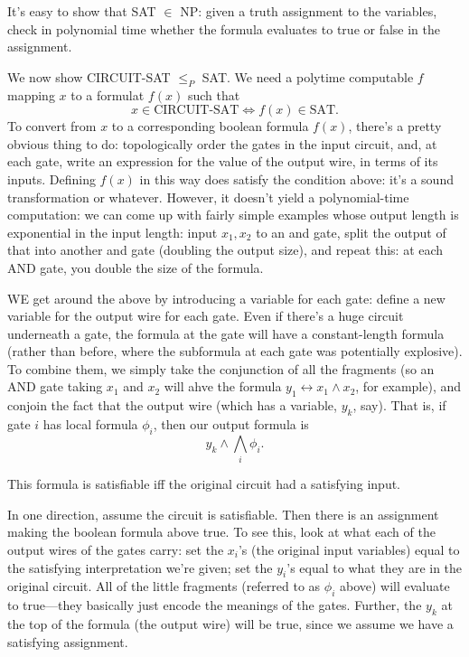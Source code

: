 \documentclass{article}
\begin{document}
It's easy to show that SAT $\in$ NP: given a truth assignment to the variables,
check in polynomial time whether the formula evaluates to true or false
in the assignment.

We now show CIRCUIT-SAT $\leq_P$ SAT. We need a polytime computable $f$
mapping $x$ to a formulat $f(x)$ such that
$$
x\in \textrm{CIRCUIT-SAT} \Leftrightarrow
f(x) \in \textrm{SAT}.
$$
To convert from $x$ to a corresponding boolean formula $f(x)$, there's a 
pretty obvious thing to do: topologically order the gates in the input
circuit, and, at each gate, write an expression for the value of the output
wire, in terms of its inputs.
Defining $f(x)$ in this way does satisfy the condition above: it's
a sound transformation or whatever.
However, it doesn't yield a polynomial-time computation: we can come up with
fairly simple examples whose output length is exponential in the input length:
input $x_1, x_2$ to an and gate, split the output of that into another
and gate (doubling the output size), and repeat this: at each AND gate, you
double the size of the formula.

WE get around the above by introducing a variable for each gate: define
a new variable for the output wire for each gate. Even if there's a huge
circuit underneath a gate, the formula at the gate will have a constant-length
formula (rather than before, where the subformula at each gate was potentially
explosive).
To combine them, we simply take the conjunction of all the fragments (so
an AND gate taking $x_1$ and $x_2$ will ahve the formula $y_1 \leftrightarrow
x_1 \wedge x_2$, for example), and conjoin the fact that the output wire
(which has a variable, $y_k$, say).
That is, if gate $i$ has local formula $\phi_i$, then our output formula is
$$
y_k \wedge \bigwedge_i \phi_i.
$$

This formula is satisfiable iff the original circuit had a satisfying input.

In one direction, assume the circuit is satisfiable. Then there is an 
assignment making the boolean formula above true. To see this, look at
what each of the output wires of the gates carry: set the $x_i$'s (the
original input variables) equal to the satisfying interpretation we're given;
set the $y_i$'s equal to what they are in the original circuit. All of the
little fragments (referred to as $\phi_i$ above) will evaluate to true---they
basically just encode the meanings of the gates. Further, the $y_k$ at the
top of the formula (the output wire) will be true, since we assume we
have a satisfying assignment.
\end{document}
